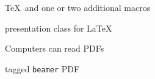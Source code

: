  \begin{description}[
  label-width=\mylabelwidth,
  label-align=left,
  left-margin=\mylabelwidth,
  action-spec=<+->, ]
  \item[\LaTeX] \TeX\ and one or two
   additional macros
  \item[\texttt{beamer}] presentation
   class for \LaTeX
  \item[tagged PDFs] Computers can read PDFs
  \item[\texttt{ltx-talk}] tagged
   \texttt{beamer} PDF
 \end{description}
